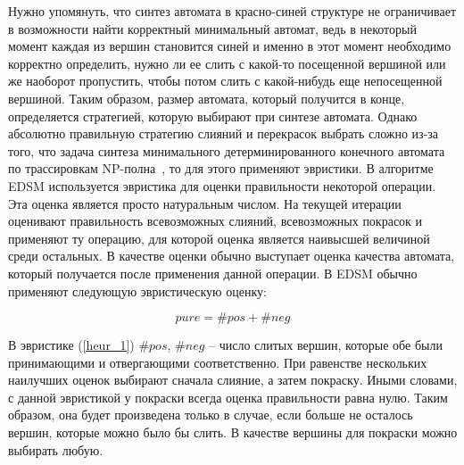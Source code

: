 \documentclass[times,specification,annotation]{itmo-student-thesis}
\begin{document}
Нужно упомянуть, что синтез автомата в красно-синей структуре не ограничивает в возможности найти корректный минимальный автомат, ведь в некоторый момент каждая из вершин становится
синей и именно в этот момент необходимо корректно определить, нужно ли ее слить с какой-то посещенной вершиной или же наоборот пропустить, чтобы потом слить с какой-нибудь
еще непосещенной вершиной. Таким образом, размер автомата, который получится в конце, определяется стратегией, которую выбирают при синтезе автомата.
Однако абсолютно правильную стратегию слияний и перекрасок выбрать сложно из-за того, что задача синтеза минимального детерминированного конечного автомата по трассировкам 
NP-полна~\cite{dfa-completeness}, то для этого применяют эвристики. В алгоритме EDSM используется эвристика для оценки правильности некоторой операции. Эта оценка является просто натуральным
числом. На текущей итерации оценивают правильность всевозможных слияний, всевозможных покрасок и применяют ту операцию, для которой оценка является наивысшей величиной среди остальных.
В качестве оценки обычно выступает оценка качества автомата, который получается после применения данной операции.
В EDSM обычно применяют следующую эвристическую оценку:

\begin{equation}
  pure = \#pos + \#neg
  \label{heur_1}
\end{equation}

В эвристике (\ref{heur_1}) $\#pos$, $\#neg$ -- число слитых вершин, которые обе были принимающими и отвергающими соответственно. При равенстве нескольких наилучших оценок выбирают сначала
слияние, а затем покраску. Иными словами, с данной эвристикой у покраски всегда оценка правильности равна нулю. Таким образом, она будет произведена только в случае, 
если больше не осталось вершин, которые можно было бы слить. В качестве вершины для покраски можно выбирать любую.
\end{document}
